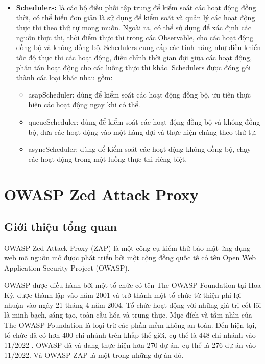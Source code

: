 \begin{itemize}
  \item \textbf{Schedulers:} là các bộ điều phối tập trung để kiểm soát các hoạt động đồng thời, có thể hiểu đơn giản là sử dụng để kiểm soát và quản lý các hoạt động thực thi theo thứ tự mong muốn.
        Ngoài ra, có thể sử dụng để xác định các nguồn thực thi, thời điểm thực thi trong các Observable, cho các hoạt động đồng bộ và không đồng bộ.
        Schedulers cung cấp các tính năng như điều khiển tốc độ thực thi các hoạt động, điều chỉnh thời gian đợi giữa các hoạt động, phân tán hoạt động cho các luồng thực thi khác.
        Schedulers được đóng gói thành các loại khác nhau gồm:
        \begin{itemize}
          \item asapScheduler: dùng để kiểm soát các hoạt động đồng bộ, ưu tiên thực hiện các hoạt động ngay khi có thể.
          \item queueScheduler: dùng để kiểm soát các hoạt động đồng bộ và không đồng bộ, đưa các hoạt động vào một hàng đợi và thực hiện chúng theo thứ tự.
          \item asyncScheduler: dùng để kiểm soát các hoạt động không đồng bộ, chạy các hoạt động trong một luồng thực thi riêng biệt.
        \end{itemize}
\end{itemize}

\section{OWASP Zed Attack Proxy}

\subsection{Giới thiệu tổng quan}

\tab OWASP Zed Attack Proxy (ZAP) là một công cụ kiểm thử bảo mật ứng dụng web mã nguồn mở được phát triển bởi một cộng đồng quốc tế có tên Open Web Application Security Project (OWASP).
\par

OWASP được điều hành bởi một tổ chức có tên The OWASP Foundation tại Hoa Kỳ, được thành lập vào năm 2001 và trở thành một tổ chức từ thiện phi lợi nhuận vào ngày 21 tháng 4 năm 2004.
Tổ chức hoạt động với những giá trị cốt lõi là minh bạch, sáng tạo, toàn cầu hóa và trung thực.
Mục đích và tầm nhìn của The OWASP Foundation là loại trừ các phần mềm không an toàn.
Đến hiện tại, tổ chức đã có hơn 400 chi nhánh trên khắp thế giới, cụ thể là 448 chi nhánh vào 11/2022 . OWASP đã và đang thực hiện hơn 270 dự án, cụ thể là 276 dự án vào 11/2022. Và OWASP ZAP là một trong những dự án đó.
\par

